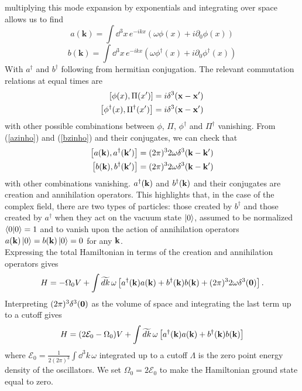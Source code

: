 multiplying this mode expansion by exponentials and integrating over space allows us to find
\begin{equation}
a(\mathbf{k})=\int \dd^{3} x\, e^{-i k x}\left(\omega \phi(x)+i \partial_{0} \phi(x)\right)
\label{azinho}
\end{equation}
\begin{equation}
b(\mathbf{k})=\int \dd^{3}x\, e^{-i k x}\left(\omega \phi^\dagger(x)+i \partial_{0} \phi^\dagger(x)\right)
\label{bzinho}
\end{equation}
With $a^\dagger$ and $b^\dagger$ following from hermitian conjugation. The relevant commutation relations at equal times are
\begin{equation}
\begin{aligned}
\comm{\phi(x)}{\Pi(x^\prime)}&=i\delta^3(\vb{x}-\vb{x}^\prime)\\
\comm{\phi^\dagger(x)}{\Pi^\dagger(x^\prime)}&=i\delta^3(\vb{x}-\vb{x}^\prime)
\end{aligned}
\end{equation}
with other possible combinations between $\phi$, $\Pi$, $\phi^\dagger$ and $\Pi^\dagger$ vanishing. From (\ref{azinho}) and (\ref{bzinho}) and their conjugates, we can check that
\begin{equation}
    \begin{aligned}
    \comm{a(\vb{k})}{a^\dagger(\vb{k}^\prime)}&=(2\pi)^3 2\omega \delta^3(\vb{k}-\vb{k}^\prime)\\
    \comm{b(\vb{k})}{b^\dagger(\vb{k}^\prime)}&=(2\pi)^3 2\omega \delta^3(\vb{k}-\vb{k}^\prime)
    \end{aligned}
\end{equation}
with other combinations  vanishing. $a^\dagger(\vb{k})$ and $b^\dagger(\vb{k})$ and their conjugates are creation and annihilation operators. This highlights that, in the case of the complex field, there are two types of particles: those created by $b^\dagger$ and those created by $a^\dagger$ when they act on the vacuum state $\ket{0}$, assumed to be normalized $\braket{0}=1$ and to vanish upon the action of annihilation operators $a(\vb{k})\ket{0}=b(\vb{k})\ket{0}=0$ for any $\vb{k}$.\\

Expressing the total Hamiltonian in terms of the creation and annihilation operators gives
\begin{equation}
H=-\Omega_{0} V+\int \widetilde{d k}\,\omega\left[a^{\dagger}(\vb{k}) a(\vb{k})+b^{\dagger}(\vb{k}) b(\vb{k})+(2 \pi)^{3} 2 \omega \delta^{3}(\vb{0})\right].
\end{equation}
Interpreting $(2\pi)^3\delta^3(\vb{0})$ as the volume of space and integrating the last term up to a cutoff gives
\begin{equation}
    H=(2\mathcal{E}_0-\Omega_0)V+\int \widetilde{d k}\,\omega\left[a^{\dagger}(\vb{k}) a(\vb{k})+b^{\dagger}(\vb{k}) b(\vb{k})\right]
\end{equation}
where $\mathcal{E}_0=\frac{1}{2(2\pi)^3}\int\dd^3 k\,\omega$ integrated up to a cutoff $\Lambda$ is the zero point energy density of the oscillators. We set $\Omega_0=2\mathcal{E}_0$ to make the Hamiltonian ground state equal to zero.
